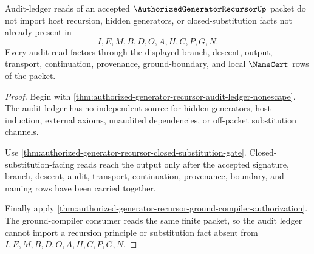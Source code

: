 \begin{theorem}
\label{thm:authorized-generator-recursor-ledger-separation}
Audit-ledger reads of an accepted $\AuthorizedGeneratorRecursorUp$ packet do not import host recursion, hidden generators, or closed-substitution facts not already present in
$$
I,E,M,B,D,O,A,H,C,P,G,N.
$$
Every audit read factors through the displayed branch, descent, output, transport, continuation, provenance, ground-boundary, and local $\NameCert$ rows of the packet.
\end{theorem}
\begin{proof}
Begin with \autoref{thm:authorized-generator-recursor-audit-ledger-nonescape}. The audit ledger has no independent source for hidden generators, host induction, external axioms, unaudited dependencies, or off-packet substitution channels.

Use \autoref{thm:authorized-generator-recursor-closed-substitution-gate}. Closed-substitution-facing reads reach the output only after the accepted signature, branch, descent, audit, transport, continuation, provenance, boundary, and naming rows have been carried together.

Finally apply \autoref{thm:authorized-generator-recursor-ground-compiler-authorization}. The ground-compiler consumer reads the same finite packet, so the audit ledger cannot import a recursion principle or substitution fact absent from $I,E,M,B,D,O,A,H,C,P,G,N$.
\end{proof}

